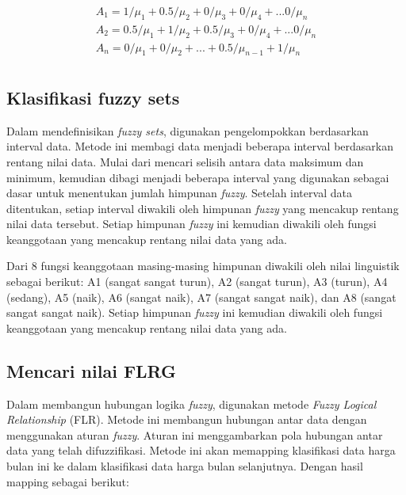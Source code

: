 \documentclass[conference]{IEEEtran}
\begin{document}
\begin{equation}
\label{eq:1}
\begin{aligned}
    {A_1} = 1/{\mu_1} + 0.5/{\mu_2} + 0/{\mu_3} + 0/{\mu_4} + ... 0/{\mu_n} \\
    {A_2} = 0.5/{\mu_1} + 1/{\mu_2} + 0.5/{\mu_3} + 0/{\mu_4} + ... 0/{\mu_n} \\
    {A_n} = 0/{\mu_1} + 0/{\mu_2} + ... + 0.5/{\mu_{n-1}} + 1/{\mu_n} \\
\end{aligned}
\end{equation}

   



\subsection{Klasifikasi fuzzy sets}
Dalam mendefinisikan \textit{fuzzy sets}, digunakan pengelompokkan berdasarkan interval data. Metode ini membagi data menjadi beberapa interval berdasarkan rentang nilai data. Mulai dari mencari selisih antara data maksimum dan minimum, kemudian dibagi menjadi beberapa interval yang digunakan sebagai dasar untuk menentukan jumlah himpunan \textit{fuzzy}. Setelah interval data ditentukan, setiap interval diwakili oleh himpunan \textit{fuzzy} yang mencakup rentang nilai data tersebut. Setiap himpunan \textit{fuzzy} ini kemudian diwakili oleh fungsi keanggotaan yang mencakup rentang nilai data yang ada.

Dari 8 fungsi keanggotaan masing-masing himpunan diwakili oleh nilai linguistik sebagai berikut: A1 (sangat sangat turun), A2 (sangat turun), A3 (turun), A4 (sedang), A5 (naik), A6 (sangat naik), A7 (sangat sangat naik), dan A8 (sangat sangat sangat naik). Setiap himpunan \textit{fuzzy} ini kemudian diwakili oleh fungsi keanggotaan yang mencakup rentang nilai data yang ada. 

\subsection{Mencari nilai FLRG}
Dalam membangun hubungan logika \textit{fuzzy}, digunakan metode \textit{Fuzzy Logical Relationship} (FLR). Metode ini membangun hubungan antar data dengan menggunakan aturan \textit{fuzzy}. Aturan ini menggambarkan pola hubungan antar data yang telah difuzzifikasi. Metode ini akan memapping klasifikasi data harga bulan ini ke dalam klasifikasi data harga bulan selanjutnya. Dengan hasil mapping sebagai berikut:
\end{document}
